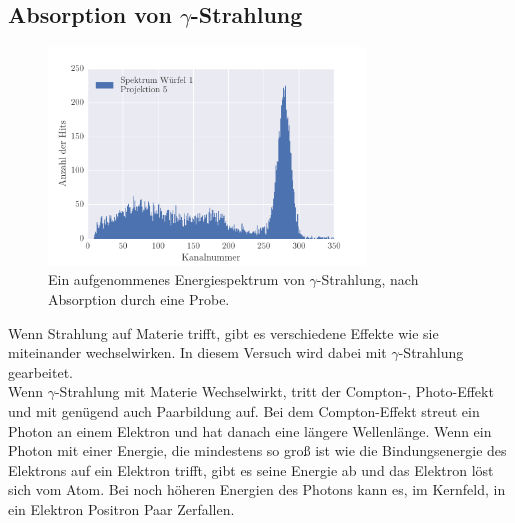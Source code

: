 \subsection{Absorption von $\gamma$-Strahlung}
\begin{figure}[h!]
	\centering
	\includegraphics[width = 0.75\textwidth]{../Grafiken/Spektrum_Block_1_Messung_5_0_350_histogram.pdf}
	\caption{Ein aufgenommenes Energiespektrum von $\gamma$-Strahlung, nach Absorption durch eine Probe.}\label{fig:EnergieSpektrum}
\end{figure}
Wenn Strahlung auf Materie trifft, gibt es verschiedene Effekte wie sie miteinander wechselwirken. 
In diesem Versuch wird dabei mit $\gamma$-Strahlung gearbeitet.\\
Wenn $\gamma$-Strahlung mit Materie Wechselwirkt, tritt der Compton-, Photo-Effekt und mit genügend auch Paarbildung auf.
Bei dem Compton-Effekt streut ein Photon an einem Elektron und hat danach eine längere Wellenlänge.
Wenn ein Photon mit einer Energie, die mindestens so groß ist wie die Bindungsenergie des Elektrons auf ein Elektron trifft, gibt es seine Energie ab und das Elektron löst sich vom Atom.
Bei noch höheren Energien des Photons kann es, im Kernfeld, in ein Elektron Positron Paar Zerfallen.

\newpage
